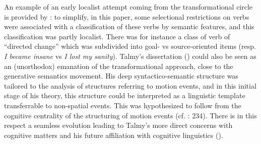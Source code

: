 \documentclass[output=paper]{langscibook}
\begin{document}
An example of an early localist attempt coming from the transformational circle is provided by \citet{Lakoff1976}: to simplify, in this paper, some selectional restrictions on verbs were associated with a classification of these verbs by semantic features, and this classification was partly localist. There was for instance a class of verb of “directed change” which was subdivided into goal- vs source-oriented items (resp. \textit{I became insane} vs \textit{I lost my sanity}). Talmy’s dissertation (\citeyear{talmy_semantic_1972}) could also be seen as an (unorthodox) emanation of the transformational approach, close to the generative semantics movement. His deep syntactico-semantic structure was tailored to the analysis of structures referring to motion events, and in this initial stage of his theory, this structure could be interpreted as a linguistic template transferrable to non-spatial events. This was hypothesized to follow from the cognitive centrality of the structuring of motion events (cf. \citealt{kimball_semantics_1975}: 234). There is in this respect a seamless evolution leading to Talmy’s more direct concerns with cognitive matters and his future affiliation with cognitive linguistics (\citealt{fortis_morpho-syntax_2016}).
\end{document}
